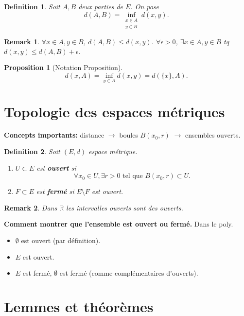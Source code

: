 \documentclass{article}
\newtheorem{proposition}{Proposition}
\newtheorem{definition}{Definition}
\newtheorem{remark}{Remark}
\begin{document}
\begin{definition}
Soit $A, B$ deux parties de $E$. On pose
\[
d(A, B) = \inf_{\substack{x \in A \\ y \in B}} d(x, y).
\]
\end{definition}

\begin{remark}
$\forall x \in A, y \in B$, $d(A, B) \leq d(x, y)$.
$\forall \epsilon > 0$, $\exists x \in A, y \in B$ tq $d(x, y) \leq d(A, B) + \epsilon$.
\end{remark}

\begin{proposition}
[Notation Proposition]
\[
d(x, A) = \inf_{y \in A} d(x, y) = d(\{x\}, A).
\]
\end{proposition}

\section{Topologie des espaces métriques}

\textbf{Concepts importants:} distance $\to$ boules $B(x_0, r)$ $\to$ ensembles ouverts.

\begin{definition}
Soit $(E, d)$ espace métrique.
\begin{enumerate}
    \item $U \subset E$ est \textbf{ouvert} si
    \[
    \forall x_0 \in U, \exists r > 0 \text{ tel que } B(x_0, r) \subset U.
    \]
    \item $F \subset E$ est \textbf{fermé} si $E \setminus F$ est ouvert.
\end{enumerate}
\end{definition}

\begin{remark}
Dans $\mathbb{R}$ les intervalles ouverts sont des ouverts.
\end{remark}

\textbf{Comment montrer que l'ensemble est ouvert ou fermé.} Dans le poly.

\begin{itemize}
    \item $\emptyset$ est ouvert (par définition).
    \item $E$ est ouvert.
    \item $E$ est fermé, $\emptyset$ est fermé (comme complémentaires d'ouverts).
\end{itemize}

\section{Lemmes et théorèmes}
\end{document}
